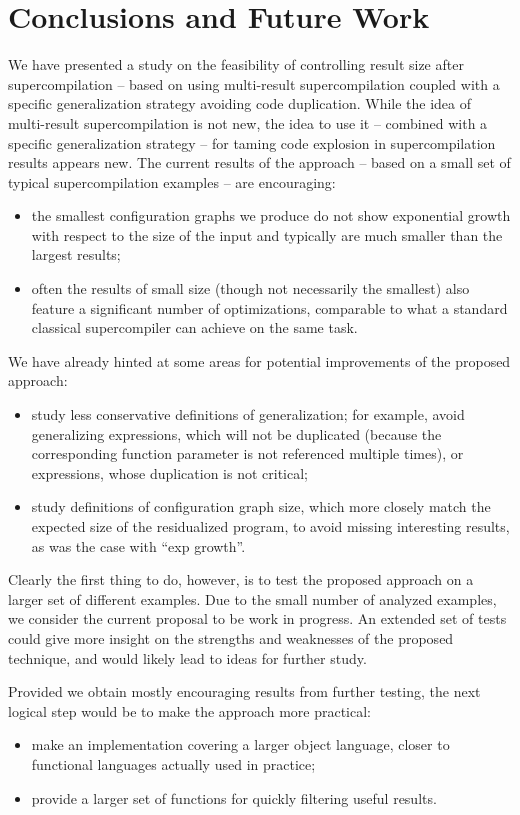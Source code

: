 \documentclass[submission,copyright,creativecommons]{eptcs}
\begin{document}
\section{Conclusions and Future Work}

We have presented a study on the feasibility of controlling result size after supercompilation
-- based on using multi-result supercompilation coupled with a specific generalization
strategy avoiding code duplication.
While the idea of multi-result supercompilation is not new, the idea to use it -- combined
with a specific generalization strategy -- for taming code explosion in supercompilation results
appears new.
The current results of the approach -- based on a small set of typical supercompilation examples --
are encouraging:
\begin{itemize}
  \item the smallest configuration graphs we produce do not show exponential growth with respect 
    to the size of the input and typically are much smaller than the largest results;
  \item often the results of small size (though not necessarily the smallest) also feature a
    significant number of optimizations, comparable to what a standard classical supercompiler
    can achieve on the same task.
\end{itemize}

We have already hinted at some areas for potential improvements of the proposed approach:
\begin{itemize}
  \item study less conservative definitions of generalization; for example, avoid generalizing
    expressions, which will not be duplicated (because the corresponding function parameter is
    not referenced multiple times), or expressions, whose duplication is not critical;
  \item study definitions of configuration graph size, which more closely match the expected
    size of the residualized program, to avoid missing interesting results, as was the case
    with ``exp growth''.
\end{itemize}
Clearly the first thing to do, however, is to test the proposed approach on a larger set of
different examples.
Due to the small number of analyzed examples, we consider the current proposal to be work in
progress.
An extended set of tests could give more insight on the strengths and weaknesses of the 
proposed technique, and would likely lead to ideas for further study.

Provided we obtain mostly encouraging results from further testing, the next logical 
step would be to make the approach more practical:
\begin{itemize}
  \item make an implementation covering a larger object language, closer to functional languages
    actually used in practice;
  \item provide a larger set of functions for quickly filtering useful results.
\end{itemize}
\end{document}
